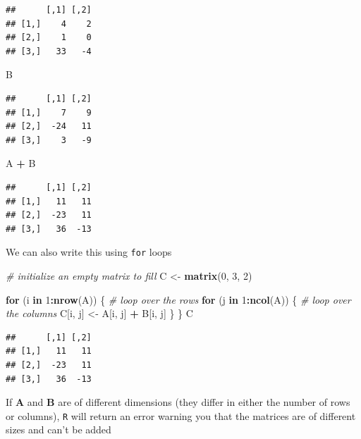 \documentclass[
]{book}
\newenvironment{Shaded}{\begin{snugshade}}{\end{snugshade}}
\newcommand{\CommentTok}[1]{\textcolor[rgb]{0.56,0.35,0.01}{\textit{#1}}}
\newcommand{\ControlFlowTok}[1]{\textcolor[rgb]{0.13,0.29,0.53}{\textbf{#1}}}
\newcommand{\DecValTok}[1]{\textcolor[rgb]{0.00,0.00,0.81}{#1}}
\newcommand{\KeywordTok}[1]{\textcolor[rgb]{0.13,0.29,0.53}{\textbf{#1}}}
\newcommand{\NormalTok}[1]{#1}
\newcommand{\OperatorTok}[1]{\textcolor[rgb]{0.81,0.36,0.00}{\textbf{#1}}}
\newcommand{\StringTok}[1]{\textcolor[rgb]{0.31,0.60,0.02}{#1}}
\theoremstyle{definition}
\theoremstyle{definition}
\theoremstyle{definition}
\theoremstyle{remark}
\begin{document}
\begin{verbatim}
##      [,1] [,2]
## [1,]    4    2
## [2,]    1    0
## [3,]   33   -4
\end{verbatim}

\begin{Shaded}
\begin{Highlighting}[]
\NormalTok{B}
\end{Highlighting}
\end{Shaded}

\begin{verbatim}
##      [,1] [,2]
## [1,]    7    9
## [2,]  -24   11
## [3,]    3   -9
\end{verbatim}

\begin{Shaded}
\begin{Highlighting}[]
\NormalTok{A }\OperatorTok{+}\StringTok{ }\NormalTok{B}
\end{Highlighting}
\end{Shaded}

\begin{verbatim}
##      [,1] [,2]
## [1,]   11   11
## [2,]  -23   11
## [3,]   36  -13
\end{verbatim}

We can also write this using \texttt{for} loops

\begin{Shaded}
\begin{Highlighting}[]
\CommentTok{# initialize an empty matrix to fill}
\NormalTok{C <-}\StringTok{ }\KeywordTok{matrix}\NormalTok{(}\DecValTok{0}\NormalTok{, }\DecValTok{3}\NormalTok{, }\DecValTok{2}\NormalTok{)}

\ControlFlowTok{for}\NormalTok{ (i }\ControlFlowTok{in} \DecValTok{1}\OperatorTok{:}\KeywordTok{nrow}\NormalTok{(A)) \{         }\CommentTok{# loop over the rows}
    \ControlFlowTok{for}\NormalTok{ (j }\ControlFlowTok{in} \DecValTok{1}\OperatorTok{:}\KeywordTok{ncol}\NormalTok{(A)) \{     }\CommentTok{# loop over the columns}
\NormalTok{        C[i, j] <-}\StringTok{ }\NormalTok{A[i, j] }\OperatorTok{+}\StringTok{ }\NormalTok{B[i, j]}
\NormalTok{    \}}
\NormalTok{\}}
\NormalTok{C}
\end{Highlighting}
\end{Shaded}

\begin{verbatim}
##      [,1] [,2]
## [1,]   11   11
## [2,]  -23   11
## [3,]   36  -13
\end{verbatim}

If \(\mathbf{A}\) and \(\mathbf{B}\) are of different dimensions (they differ in either the number of rows or columns), \texttt{R} will return an error warning you that the matrices are of different sizes and can't be added
\end{document}
